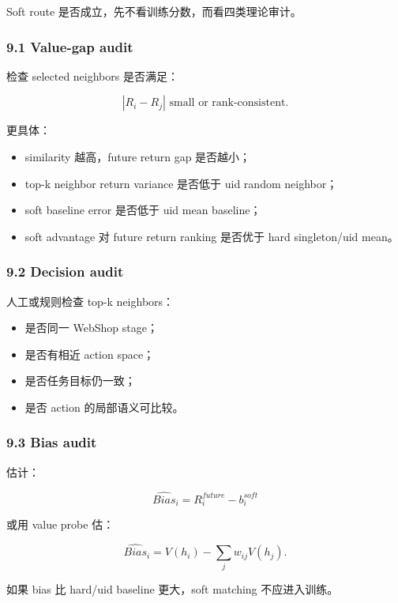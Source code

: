 \documentclass[
  10pt,
]{ctexart}
\providecommand{\tightlist}{%
  \setlength{\itemsep}{0pt}\setlength{\parskip}{0pt}}
\begin{document}
Soft route 是否成立，先不看训练分数，而看四类理论审计。

\subsubsection{9.1 Value-gap audit}\label{value-gap-audit}

检查 selected neighbors 是否满足：

\[
|R_i-R_j| \text{ small or rank-consistent}.
\]

更具体：

\begin{itemize}
\tightlist
\item
  similarity 越高，future return gap 是否越小；
\item
  top-k neighbor return variance 是否低于 uid random neighbor；
\item
  soft baseline error 是否低于 uid mean baseline；
\item
  soft advantage 对 future return ranking 是否优于 hard singleton/uid
  mean。
\end{itemize}

\subsubsection{9.2 Decision audit}\label{decision-audit}

人工或规则检查 top-k neighbors：

\begin{itemize}
\tightlist
\item
  是否同一 WebShop stage；
\item
  是否有相近 action space；
\item
  是否任务目标仍一致；
\item
  是否 action 的局部语义可比较。
\end{itemize}

\subsubsection{9.3 Bias audit}\label{bias-audit}

估计：

\[
\widehat{Bias}_i = R_i^{future} - b_i^{soft}
\]

或用 value probe 估：

\[
\widehat{Bias}_i = V(h_i)-\sum_jw_{ij}V(h_j).
\]

如果 bias 比 hard/uid baseline 更大，soft matching 不应进入训练。
\end{document}
